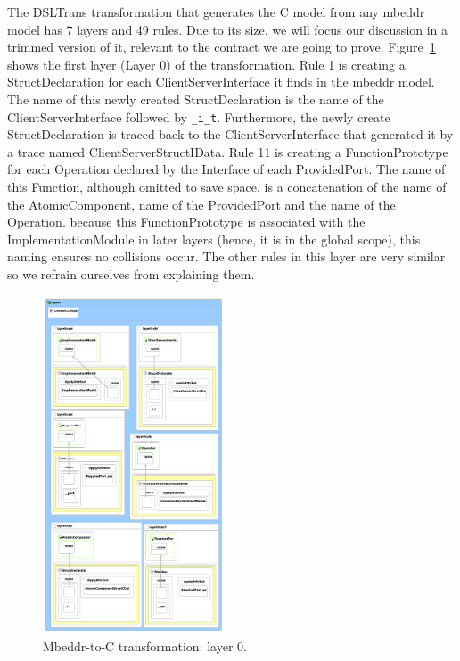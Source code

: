 The DSLTrans transformation that generates the C model from any mbeddr model has  7 layers and 49 rules. Due to its size, we will focus our discussion in a trimmed version of it, relevant to the contract we are going to prove.
Figure~\ref{fig:mb2c_layer_0} shows the first layer (Layer 0) of the transformation. Rule 1 is creating a StructDeclaration for each ClientServerInterface it finds in the mbeddr model. 
The name of this newly created StructDeclaration is the name of the ClientServerInterface followed by \verb=_i_t=.
Furthermore, the newly create StructDeclaration is traced back to the ClientServerInterface that generated it by a trace named ClientServerStructIData. 
Rule 11 is creating a FunctionPrototype for each Operation declared by the Interface of each ProvidedPort. The name of this Function, although omitted to save space, is a concatenation of the name of the AtomicComponent, name of the ProvidedPort and the name of the Operation. because this FunctionPrototype is associated with the ImplementationModule in later layers (hence, it is in the global scope), this naming ensures no collisions occur.
The other rules in this layer are very similar so we refrain ourselves from explaining them.

\begin{figure}
\begin{center}
  \includegraphics[width=0.48\textwidth]{figures/mbeddr2C_optimized_layer_0}
  \caption{Mbeddr-to-C transformation: layer 0.}
  \label{fig:mb2c_layer_0}
\end{center}
\end{figure}

